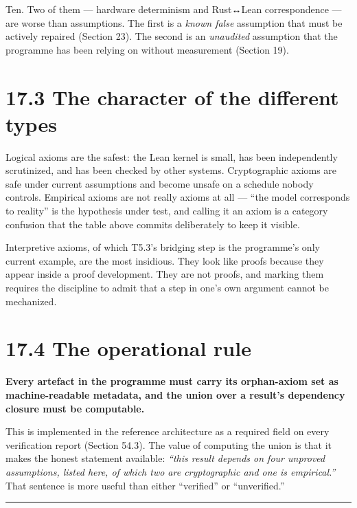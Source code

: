 \documentclass[
  11pt]{report}
\begin{document}
Ten. Two of them --- hardware determinism and Rust↔Lean correspondence
--- are worse than assumptions. The first is a \emph{known false}
assumption that must be actively repaired (Section 23). The second is an
\emph{unaudited} assumption that the programme has been relying on
without measurement (Section 19).

\hypertarget{the-character-of-the-different-types}{%
\section{17.3 The character of the different
types}\label{the-character-of-the-different-types}}

Logical axioms are the safest: the Lean kernel is small, has been
independently scrutinized, and has been checked by other systems.
Cryptographic axioms are safe under current assumptions and become
unsafe on a schedule nobody controls. Empirical axioms are not really
axioms at all --- ``the model corresponds to reality'' is the hypothesis
under test, and calling it an axiom is a category confusion that the
table above commits deliberately to keep it visible.

Interpretive axioms, of which T5.3's bridging step is the programme's
only current example, are the most insidious. They look like proofs
because they appear inside a proof development. They are not proofs, and
marking them requires the discipline to admit that a step in one's own
argument cannot be mechanized.

\hypertarget{the-operational-rule}{%
\section{17.4 The operational rule}\label{the-operational-rule}}

\textbf{Every artefact in the programme must carry its orphan-axiom set
as machine-readable metadata, and the union over a result's dependency
closure must be computable.}

This is implemented in the reference architecture as a required field on
every verification report (Section 54.3). The value of computing the
union is that it makes the honest statement available: \emph{``this
result depends on four unproved assumptions, listed here, of which two
are cryptographic and one is empirical.''} That sentence is more useful
than either ``verified'' or ``unverified.''

\begin{center}\rule{0.5\linewidth}{0.5pt}\end{center}
\end{document}
